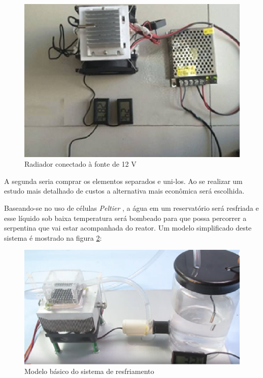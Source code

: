 \begin{figure}[h]
	\centering
	\includegraphics[keepaspectratio=true,scale=0.6]{figuras/radiador2.eps}
	\caption{Radiador conectado à fonte de 12 V}
	\label{radiador2}
\end{figure}

A segunda seria comprar os elementos separados e uni-los. Ao se realizar um estudo mais detalhado de custos a alternativa mais econômica será escolhida.

Baseando-se no uso de células \textit{Peltier} , a água em um reservatório será resfriada e esse líquido sob baixa temperatura será bombeado para que possa percorrer a serpentina que vai estar acompanhada do reator. Um modelo simplificado deste sistema é mostrado na figura \ref{resfriamento}:

\begin{figure}[h]
	\centering
	\includegraphics[keepaspectratio=true,scale=0.5]{figuras/resfriamento.eps}
	\caption{Modelo básico do sistema de resfriamento}
	\label{resfriamento}
\end{figure}

